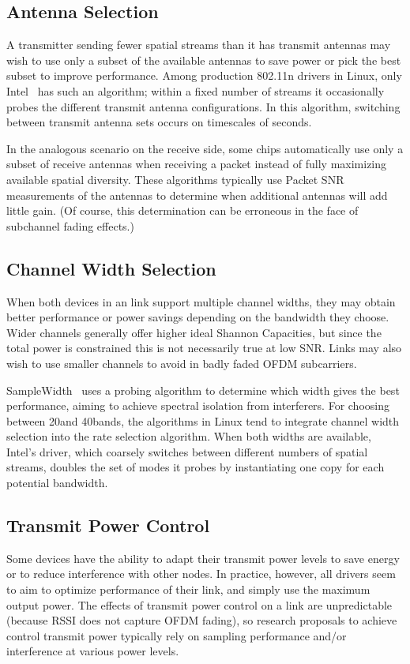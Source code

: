 \subsection{Antenna Selection}
A transmitter sending fewer spatial streams than it has transmit antennas may wish to use only a subset of the available antennas to save power or pick the best subset to improve performance. Among production 802.11n drivers in Linux, only Intel~\cite{iwlwifi} has such an algorithm; within a fixed number of streams it occasionally probes the different transmit antenna configurations. In this algorithm, switching between transmit antenna sets occurs on timescales of seconds.

In the analogous scenario on the receive side, some chips automatically use only a subset of receive antennas when receiving a packet instead of fully maximizing available spatial diversity. These algorithms typically use Packet SNR measurements of the antennas to determine when additional antennas will add little gain. (Of course, this determination can be erroneous in the face of subchannel fading effects.)

\subsection{Channel Width Selection}
When both devices in an link support multiple channel widths, they may obtain better performance or power savings depending on the bandwidth they choose. Wider channels generally offer higher ideal Shannon Capacities, but since the total power is constrained this is not necessarily true at low SNR. Links may also wish to use smaller channels to avoid in badly faded OFDM subcarriers.

SampleWidth~\cite{Chandra_SampleWidth} uses a probing algorithm to determine which width gives the best performance, aiming to achieve spectral isolation from interferers. For choosing between 20\MHz and 40\MHz bands, the algorithms in Linux tend to integrate channel width selection into the rate selection algorithm. When both widths are available, Intel's driver, which coarsely switches between different numbers of spatial streams, doubles the set of modes it probes by instantiating one copy for each potential bandwidth.

\subsection{Transmit Power Control}
Some devices have the ability to adapt their transmit power levels to save energy or to reduce interference with other nodes. In practice, however, all drivers seem to aim to optimize performance of their link, and simply use the maximum output power. The effects of transmit power control on a link are unpredictable (because RSSI does not capture OFDM fading), so research proposals to achieve control transmit power typically rely on sampling performance and/or interference at various power levels.

